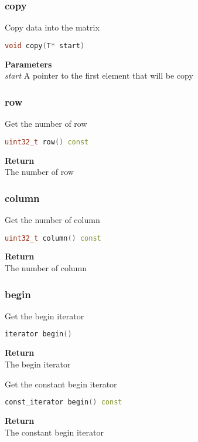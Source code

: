 \subsubsection{copy}
\begin{mdframed}
Copy data into the matrix
\begin{lstlisting}[language=C++]
void copy(T* start)
\end{lstlisting}
\textbf{Parameters} \\ 
\textit{start} A pointer to the first element that will be copy \\ 
\end{mdframed}

\subsubsection{row}
\begin{mdframed}
Get the number of row
\begin{lstlisting}[language=C++]
uint32_t row() const 
\end{lstlisting}
\textbf{Return} \\ 
The number of row\\ 
\end{mdframed}

\subsubsection{column}
\begin{mdframed}
Get the number of column
\begin{lstlisting}[language=C++]
uint32_t column() const 
\end{lstlisting}
\textbf{Return} \\ 
The number of column\\ 
\end{mdframed}

\subsubsection{begin}
\begin{mdframed}
Get the begin iterator
\begin{lstlisting}[language=C++]
iterator begin() 
\end{lstlisting}
\textbf{Return} \\ 
The begin iterator\\ 
\end{mdframed}

\begin{mdframed}
Get the constant begin iterator
\begin{lstlisting}[language=C++]
const_iterator begin() const 
\end{lstlisting}
\textbf{Return} \\ 
The constant begin iterator\\ 
\end{mdframed}

